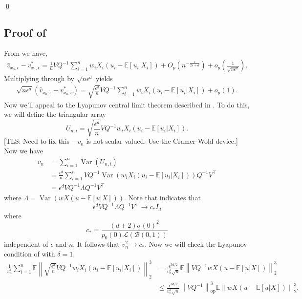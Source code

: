 \documentclass[11pt]{article}
\newcommand{\tls}[1]{{\color{cyan}[TLS: #1]}}
\begin{document}
\qed{}



\subsection{Proof of } \label{sec: proof of central limit for v}
From  we have, 
\begin{align*}
    \hat{v}_{x_0, \epsilon} - v^*_{x_0, \epsilon} = \frac{1}{n}VQ^{-1}\sum_{i = 1}^nw_iX_i(u_i - \mathbb{E}[u_i|X_i]) 
    + O_p\left(n^{-\frac{s}{2s+d}}\right) + o_p\left(\frac{1}{\sqrt{n\epsilon^d}}\right).
\end{align*}
Multiplying through by $\sqrt{n\epsilon^{d}}$ yields
\begin{align*}
    \sqrt{n\epsilon^{d}}(\hat{v}_{x_0, \epsilon} - v^*_{x_0, \epsilon}) = \sqrt{\frac{\epsilon^{d}}{n}}VQ^{-1}\sum_{i = 1}^nw_iX_i(u_i - \mathbb{E}[u_i|X_i]) 
    + o_p\left(1\right).
\end{align*}
Now we'll appeal to the Lyapunov central limit theorem described in . To do this, we will define the triangular array
\[U_{n, i} = \sqrt{\frac{\epsilon^{d}}{n}}VQ^{-1}w_iX_i(u_i - \mathbb{E}[u_i|X_i]).\]
\tls{Need to fix this -- $v_n$ is not scalar valued. Use the Cramer-Wold device.} Now we have
\begin{align*}
    v_n &= \sum_{i = 1}^n\operatorname{Var}(U_{n, i}) \\
    &= \frac{\epsilon^d}{n}\sum_{i = 1}^nVQ^{-1}\operatorname{Var}(w_iX_i(u_i - \mathbb{E}[u_i|X_i]))Q^{-1}V^{\top} \tag{independence} \\
    &= \epsilon^dVQ^{-1}\Lambda Q^{-1}V^{\top} \tag{identically distributed for fixed $n$}
\end{align*}
where $\Lambda = \operatorname{Var}(wX(u - \mathbb{E}[u|X]))$. Note that  indicates that
\[\epsilon^dVQ^{-1}\Lambda Q^{-1}V^{\top} \rightarrow  c_*I_d \]
where
\[c_* = \frac{(d+2)\sigma(0)^2}{p_0(0)\mathcal{L}(\mathcal{B}(0,1))}\]
independent of $\epsilon$ and $n$. It follows that $v_n^2 \rightarrow c_*$. Now we will check the Lyapunov condition of  with $\delta = 1$,
\begin{align*}
     \frac{1}{v_n^{3}}\sum_{i = 1}^n\mathbb{E}\left\|\sqrt{\frac{\epsilon^{d}}{n}}VQ^{-1}w_iX_i(u_i - \mathbb{E}[u_i|X_i])\right\|_2^3 &= \frac{\epsilon^{3d/2}}{v_n^3\sqrt{n}}\mathbb{E}\left\|VQ^{-1}wX(u - \mathbb{E}[u|X])\right\|_2^3 \\
     &\leq \frac{\epsilon^{3d/2}}{v_n^3\sqrt{n}}\left\|VQ^{-1}\right\|_{\text{op}}^3\mathbb{E}\left\|wX(u - \mathbb{E}[u|X])\right\|_2^3.
\end{align*}
\end{document}
